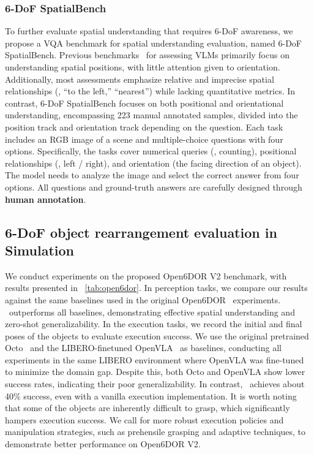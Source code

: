 \subsubsection{6-DoF SpatialBench}
To further evaluate spatial understanding that requires 6-DoF awareness,
we propose a VQA benchmark for spatial understanding evaluation, named 6-DoF SpatialBench.
Previous benchmarks~\cite{SpatialRGPT24,SpatialBot24,embspatial24,space3d24} for assessing VLMs primarily focus on understanding spatial positions, with little attention given to orientation. 
Additionally, most assessments emphasize relative and imprecise spatial relationships (\eg, ``to the left,'' ``nearest'') while lacking quantitative metrics.
In contrast, 6-DoF SpatialBench focuses on both positional and orientational understanding, encompassing 223 manual annotated samples, divided into the position track and orientation track depending on the question.
Each task includes an RGB image of a scene and multiple-choice questions with four options. Specifically, the tasks cover numerical queries (\eg, counting), positional relationships (\eg, left / right), and orientation (the facing direction of an object). The model needs to analyze the image and select the correct answer from four options. All questions and ground-truth answers are carefully designed through \textbf{human annotation}.


\subsection{6-DoF object rearrangement evaluation in Simulation}
We conduct experiments on the proposed Open6DOR V2 benchmark, with results presented in ~\cref{tab:open6dor}. In perception tasks, we compare our results against the same baselines used in the original Open6DOR~\cite{Open6DOR24} experiments. \ours~outperforms all baselines, demonstrating effective spatial understanding and zero-shot generalizability.
In the execution tasks, we record the initial and final poses of the objects to evaluate execution success. We use the original pretrained Octo~\cite{Octo24} and the LIBERO-finetuned OpenVLA~\cite{OpenVLA24} as baselines, conducting all experiments in the same LIBERO environment where OpenVLA was fine-tuned to minimize the domain gap. 
Despite this, both Octo and OpenVLA show lower success rates, indicating their poor generalizability. In contrast, \ours~achieves about 40\% success, even with a vanilla execution implementation. It is worth noting that some of the objects are inherently difficult to grasp, which significantly hampers execution success. We call for more robust execution policies and manipulation strategies, such as prehensile grasping and adaptive techniques, to demonstrate better performance on Open6DOR V2.

